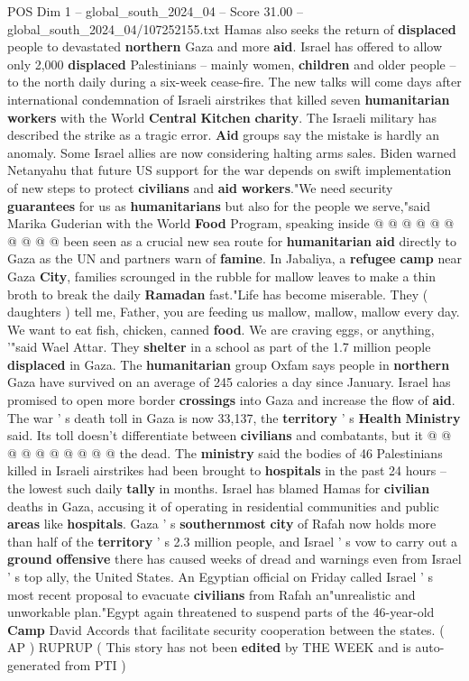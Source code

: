 \begin{textsample}{POS Dim 1 – global\_south\_2024\_04 – Score 31.00 – global\_south\_2024\_04/107252155.txt}
Hamas also seeks the return of \textbf{displaced} people to devastated \textbf{northern} Gaza and more \textbf{aid}.
Israel has offered to allow only 2,000 \textbf{displaced} Palestinians -- mainly women, \textbf{children} and older people -- to the north daily during a six-week cease-fire.
The new talks will come days after international condemnation of Israeli airstrikes that killed seven \textbf{humanitarian} \textbf{workers} with the World \textbf{Central} \textbf{Kitchen} \textbf{charity}.
The Israeli military has described the strike as a tragic error. \textbf{Aid} groups say the mistake is hardly an anomaly.
Some Israel allies are now considering halting arms sales.
Biden warned Netanyahu that future US support for the war depends on swift implementation of new steps to protect \textbf{civilians} and \textbf{aid} \textbf{workers}."We need security \textbf{guarantees} for us as \textbf{humanitarians} but also for the people we serve,"said Marika Guderian with the World \textbf{Food} Program, speaking inside @ @ @ @ @ @ @ @ @ @ been seen as a crucial new sea route for \textbf{humanitarian} \textbf{aid} directly to Gaza as the UN and partners warn of \textbf{famine}.
In Jabaliya, a \textbf{refugee} \textbf{camp} near Gaza \textbf{City}, families scrounged in the rubble for mallow leaves to make a thin broth to break the daily \textbf{Ramadan} fast."Life has become miserable.
They ( daughters ) tell me, Father, you are feeding us mallow, mallow, mallow every day.
We want to eat fish, chicken, canned \textbf{food}.
We are craving eggs, or anything, '"said Wael Attar.
They \textbf{shelter} in a school as part of the 1.7 million people \textbf{displaced} in Gaza.
The \textbf{humanitarian} group Oxfam says people in \textbf{northern} Gaza have survived on an average of 245 calories a day since January.
Israel has promised to open more border \textbf{crossings} into Gaza and increase the flow of \textbf{aid}.
The war ' s death toll in Gaza is now 33,137, the \textbf{territory} ' s \textbf{Health} \textbf{Ministry} said.
Its toll doesn't differentiate between \textbf{civilians} and combatants, but it @ @ @ @ @ @ @ @ @ @ the dead.
The \textbf{ministry} said the bodies of 46 Palestinians killed in Israeli airstrikes had been brought to \textbf{hospitals} in the past 24 hours -- the lowest such daily \textbf{tally} in months.
Israel has blamed Hamas for \textbf{civilian} deaths in Gaza, accusing it of operating in residential communities and public \textbf{areas} like \textbf{hospitals}.
Gaza ' s \textbf{southernmost} \textbf{city} of Rafah now holds more than half of the \textbf{territory} ' s 2.3 million people, and Israel ' s vow to carry out a \textbf{ground} \textbf{offensive} there has caused weeks of dread and warnings even from Israel ' s top ally, the United States.
An Egyptian official on Friday called Israel ' s most recent proposal to evacuate \textbf{civilians} from Rafah an"unrealistic and unworkable plan."Egypt again threatened to suspend parts of the 46-year-old \textbf{Camp} David Accords that facilitate security cooperation between the states. ( AP ) RUPRUP ( This story has not been \textbf{edited} by THE WEEK and is auto-generated from PTI )


\end{textsample}
